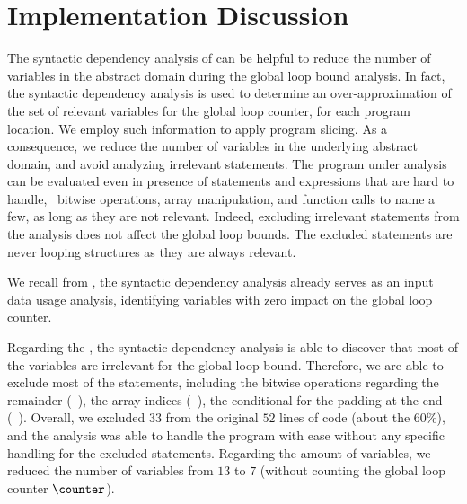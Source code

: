 \section{Implementation Discussion}

The syntactic dependency analysis of  can be helpful to reduce the number of variables in the abstract domain during the global loop bound analysis.
In fact, the syntactic dependency analysis is used to determine an over-approximation of the set of relevant variables for the global loop counter, for each program location.
We employ such information to apply program slicing.
As a consequence, we reduce the number of variables in the underlying abstract domain, and avoid analyzing irrelevant statements.
The program under analysis can be evaluated even in presence of statements and expressions that are hard to handle, \eg~bitwise operations, array manipulation, and function calls to name a few, as long as they are not relevant.
Indeed, excluding irrelevant statements from the analysis does not affect the global loop bounds.
The excluded statements are never looping structures as they are always relevant.


We recall from , the syntactic dependency analysis already serves as an input data usage analysis, identifying variables with zero impact on the global loop counter.

\begin{example}
%   

Regarding the , the syntactic dependency analysis is able to discover that most of the variables are irrelevant for the global loop bound.
Therefore, we are able to exclude most of the statements, including the bitwise operations regarding the remainder (\eg~), the array indices (\eg~), the conditional for the padding at the end (\cf~).
%
Overall, we excluded $33$ from the original $52$ lines of code (about the 60\%), and the analysis was able to handle the program with ease without any specific handling for the excluded statements.
Regarding the amount of variables, we reduced the number of variables from $13$ to $7$ (without counting the global loop counter $\counter$).
\end{example}



